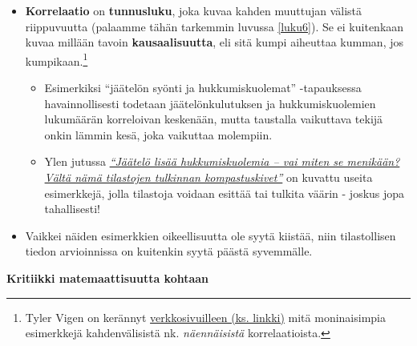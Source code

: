\documentclass[
]{book}
\providecommand{\tightlist}{%
  \setlength{\itemsep}{0pt}\setlength{\parskip}{0pt}}
\begin{document}
\begin{itemize}
\tightlist
\item
  \textbf{Korrelaatio} on \textbf{tunnusluku}, joka kuvaa kahden muuttujan välistä riippuvuutta (palaamme tähän tarkemmin luvussa \ref{luku6}). Se ei kuitenkaan kuvaa millään tavoin \textbf{kausaalisuutta}, eli sitä kumpi aiheuttaa kumman, jos kumpikaan.\footnote{Tyler Vigen on kerännyt \href{https://www.tylervigen.com/spurious-correlations}{verkkosivuilleen (ks. linkki)} mitä moninaisimpia esimerkkejä kahdenvälisistä nk. \emph{näennäisistä} korrelaatioista.}

  \begin{itemize}
  \tightlist
  \item
    Esimerkiksi ``jäätelön syönti ja hukkumiskuolemat'' -tapauksessa havainnollisesti todetaan jäätelönkulutuksen ja hukkumiskuolemien lukumäärän korreloivan keskenään, mutta taustalla vaikuttava tekijä onkin lämmin kesä, joka vaikuttaa molempiin.
  \item
    Ylen jutussa \href{https://yle.fi/aihe/artikkeli/2021/03/27/jaatelo-lisaa-hukkumiskuolemia-vai-miten-se-menikaan-valta-nama-tilastojen}{\emph{``Jäätelö lisää hukkumiskuolemia -- vai miten se menikään? Vältä nämä tilastojen tulkinnan kompastuskivet''}} on kuvattu useita esimerkkejä, jolla tilastoja voidaan esittää tai tulkita väärin - joskus jopa tahallisesti!
  \end{itemize}
\item
  Vaikkei näiden esimerkkien oikeellisuutta ole syytä kiistää, niin tilastollisen tiedon arvioinnissa on kuitenkin syytä päästä syvemmälle.
\end{itemize}

\hfill\break
\hfill\break

\textbf{Kritiikki matemaattisuutta kohtaan}
\end{document}

